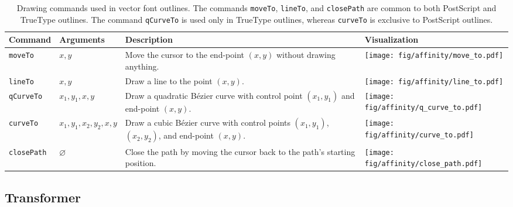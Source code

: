 \begin{table*}[!b]
    \renewcommand{\arraystretch}{1.3}
    \caption{
        \normalfont
        Drawing commands used in vector font outlines.
        The commands \texttt{moveTo}, \texttt{lineTo}, and \texttt{closePath} are common to both PostScript and TrueType outlines.
        The command \texttt{qCurveTo} is used only in TrueType outlines, whereas \texttt{curveTo} is exclusive to PostScript outlines.
    }
    \label{tab:drawing_commands}
    \centering
    \begin{tabular}{>{\centering\arraybackslash}m{2cm}>{\centering\arraybackslash}m{3cm}m{6cm}>{\centering\arraybackslash}m{4cm}}
        \hline
        \textbf{Command}   & \textbf{Arguments}           & \textbf{Description}                                                                                    & \textbf{Visualization}                                 \\
        \hline
        \texttt{moveTo}    & \(x, y\)                     & Move the cursor to the end-point \((x, y)\) without drawing anything.                                   & \texttt{[image: fig/affinity/move\_to.pdf]}    \\
        \hline
        \texttt{lineTo}    & \(x, y\)                     & Draw a line to the point \((x, y)\).                                                                    & \texttt{[image: fig/affinity/line\_to.pdf]}    \\
        \hline
        \texttt{qCurveTo}  & \(x_1, y_1, x, y\)           & Draw a quadratic Bézier curve with control point \((x_1, y_1)\) and end-point \((x, y)\).               & \texttt{[image: fig/affinity/q\_curve\_to.pdf]} \\
        \hline
        \texttt{curveTo}   & \(x_1, y_1, x_2, y_2, x, y\) & Draw a cubic Bézier curve with control points \((x_1, y_1)\), \((x_2, y_2)\), and end-point \((x, y)\). & \texttt{[image: fig/affinity/curve\_to.pdf]}   \\
        \hline
        \texttt{closePath} & \(\varnothing\)              & Close the path by moving the cursor back to the path’s starting position.                               & \texttt{[image: fig/affinity/close\_path.pdf]} \\
        \hline
    \end{tabular}
\end{table*}

\subsection{Transformer}

